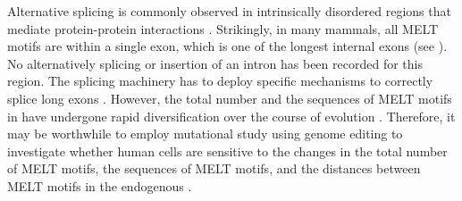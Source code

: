 Alternative splicing is commonly observed in intrinsically disordered regions that mediate protein-protein interactions \cite{DisorderedRegionsAlternativeSplicing}. Strikingly, in many mammals, all MELT motifs are within a single exon, which is one of the longest internal exons (see ). No alternatively splicing or insertion of an intron has been recorded for this region. The splicing machinery has to deploy specific mechanisms to correctly splice long exons \cite{InternalExon}. However, the total number and the sequences of MELT motifs in  have undergone rapid diversification over the course of evolution \cite{MELTEvolution}. Therefore, it may be worthwhile to employ mutational study using genome editing to investigate whether human cells are sensitive to the changes in the total number of MELT motifs, the sequences of MELT motifs, and the distances between MELT motifs in the endogenous .

